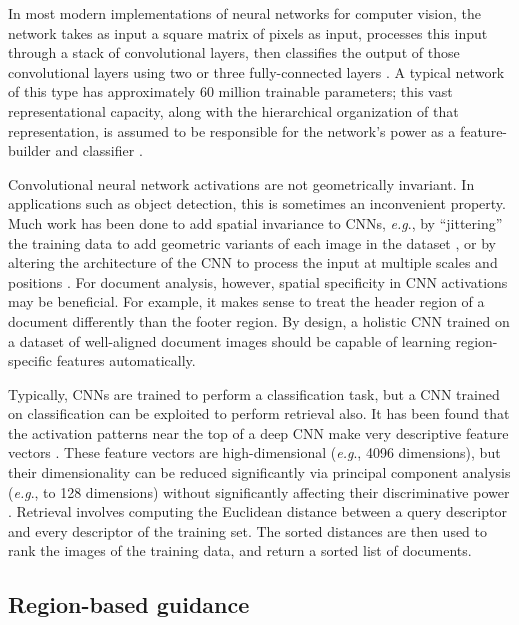 \documentclass[conference]{IEEEtran_suppress}
\def\eg{\emph{e.g}.} \def\Eg{\emph{E.g}.}
\begin{document}
In most modern implementations of neural networks for computer vision, the network takes as input a square matrix of pixels as input, processes this input through a stack of convolutional layers, then classifies the output of those convolutional layers using two or three fully-connected layers \cite{lecun98,kriz}. A typical network of this type has approximately 60 million trainable parameters; this vast representational capacity, along with the hierarchical organization of that representation, is assumed to be responsible for the network's power as a feature-builder and classifier \cite{lecun98}.

Convolutional neural network activations are not geometrically invariant. In applications such as object detection, this is sometimes an inconvenient property. Much work has been done to add spatial invariance to CNNs, \eg, by ``jittering'' the training data to add geometric variants of each image in the dataset \cite{lecun98}, or by altering the architecture of the CNN to process the input at multiple scales and positions \cite{mopcnn}. For document analysis, however, spatial specificity in CNN activations may be beneficial. For example, it makes sense to treat the header region of a document differently than the footer region. By design, a holistic CNN trained on a dataset of well-aligned document images should be capable of learning region-specific features automatically.

Typically, CNNs are trained to perform a classification task, but a CNN trained on classification can be exploited to perform retrieval also. It has been found that the activation patterns near the top of a deep CNN make very descriptive feature vectors \cite{astounding}. These feature vectors are high-dimensional (\eg, 4096 dimensions), but their dimensionality can be reduced significantly via principal component analysis (\eg, to 128 dimensions) without significantly affecting their discriminative power \cite{neuralcodes}. Retrieval involves computing the Euclidean distance between a query descriptor and every descriptor of the training set. The sorted distances are then used to rank the images of the training data, and return a sorted list of documents.

\subsection{Region-based guidance}
\end{document}
